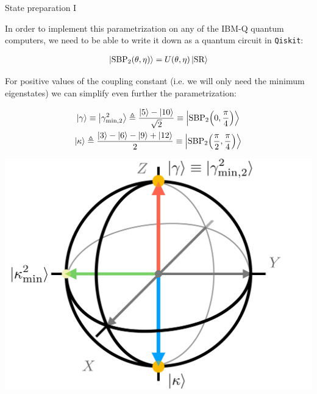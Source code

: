 \documentclass[9pt, handout, aspectratio=169]{beamer}	%
\begin{document}
\begin{frame}{State preparation I}

	\vspace{-1em}
	\begin{multicols}{2}

		In order to implement this parametrization on any of the IBM-Q quantum computers, we need to be able to write it down as a quantum circuit in \texttt{Qiskit}:

		\begin{gather*}
		  \ket{\text{SBP}_{2} \qty(\theta, \eta)} =
		    U\qty(\theta, \eta) \ket{\text{SR}}
		\end{gather*}

		For positive values of the coupling constant (i.e. we will only need the minimum eigenstates) we can simplify even further the parametrization:

		\begin{gather*}
		  \ket{\gamma} \equiv
		    \ket{\gamma_{\text{min},2}^2} \triangleq
		    \frac{\ket{5} - \ket{10}}{\sqrt{2}} \equiv
		    \ket{\text{SBP}_{2} \qty(0, \frac{\pi}{4})} \\
		  \ket{\kappa} \triangleq
		    \frac{\ket{3}-\ket{6}-\ket{9}+\ket{12}}{2} \equiv
		    \ket{\text{SBP}_{2} \qty(\frac{\pi}{2}, \frac{\pi}{4})}
		\end{gather*}

		\columnbreak \pause

		\begin{center}
			\includegraphics[width=.4\paperwidth]{Figures/NJL1-model-solving/bloch-sphere}
		\end{center}

	\end{multicols}

\end{frame}
\end{document}
